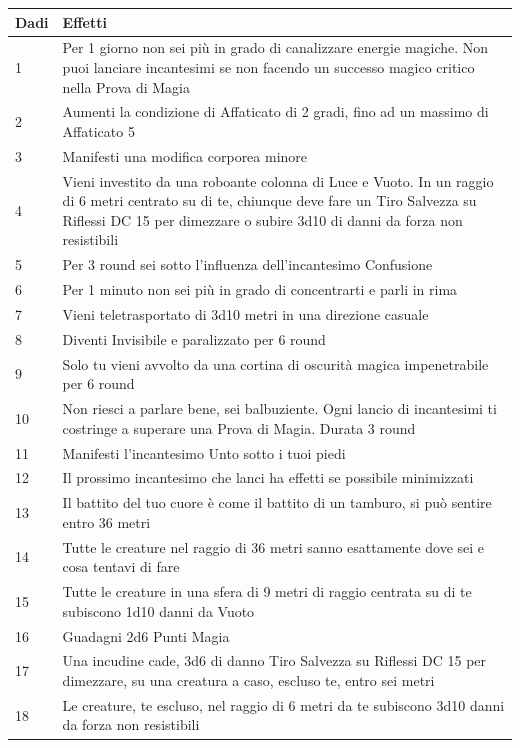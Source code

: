 \begin{multicols}{2}
\noindent\begin{tabularx}{\linewidth}{l|X}
	\toprule
\rowcolor{gray!20}\textbf{Dadi} & \textbf{Effetti}\\
\toprule
1 & Per 1 giorno non sei più in grado di canalizzare energie magiche. Non puoi lanciare incantesimi se non facendo un successo magico critico nella Prova di Magia\\
\rowcolor{gray!20}2 & Aumenti la condizione di Affaticato di 2 gradi, fino ad un massimo di Affaticato 5\\
3 & Manifesti una modifica corporea minore\\
\rowcolor{gray!20}4 & Vieni investito da una roboante colonna di Luce e Vuoto. In un raggio di 6 metri centrato su di te, chiunque deve fare un Tiro Salvezza su Riflessi DC 15 per dimezzare o subire 3d10 di danni da forza non resistibili\\
5 & Per 3 round sei sotto l'influenza dell'incantesimo Confusione\\
\rowcolor{gray!20}6 & Per 1 minuto non sei più in grado di concentrarti e parli in rima\\
7 & Vieni teletrasportato di 3d10 metri in una direzione casuale\\
\rowcolor{gray!20}8 & Diventi Invisibile e paralizzato per 6 round\\
9 & Solo tu vieni avvolto da una cortina di oscurità magica impenetrabile per 6 round\\
\rowcolor{gray!20}10 & Non riesci a parlare bene, sei balbuziente. Ogni lancio di incantesimi ti costringe a superare una Prova di Magia. Durata 3 round\\
11 & Manifesti l'incantesimo Unto sotto i tuoi piedi\\
\rowcolor{gray!20}12 & Il prossimo incantesimo che lanci ha effetti se possibile minimizzati\\
13 & Il battito del tuo cuore è come il battito di un tamburo, si può sentire entro 36 metri\\
\rowcolor{gray!20}14 & Tutte le creature nel raggio di 36 metri sanno esattamente dove sei e cosa tentavi di fare\\
15 & Tutte le creature in una sfera di 9 metri di raggio centrata su di te subiscono 1d10 danni da Vuoto\\
\rowcolor{gray!20}16 & Guadagni 2d6 Punti Magia\\
17 & Una incudine cade, 3d6 di danno Tiro Salvezza su Riflessi DC 15 per dimezzare, su una creatura a caso, escluso te, entro sei metri\\
\rowcolor{gray!20}18 & Le creature, te escluso, nel raggio di 6 metri da te subiscono 3d10 danni da forza non resistibili
\end{tabularx}


\end{multicols}

